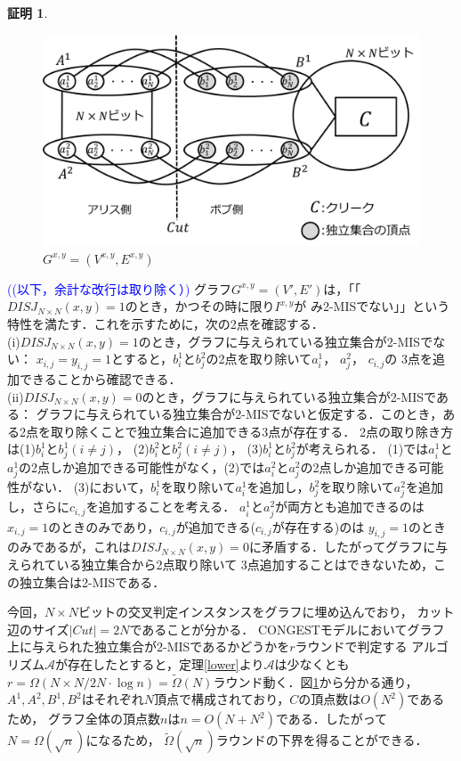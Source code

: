 \documentclass[12pt]{thesis}
\newcommand{\Izumi}[1]{\textcolor{blue}{(#1)}}
\newcommand{\CONGEST}{\textsf{CONGEST}}
\theoremstyle{definition}
\newtheorem*{prf*}{証明}
\begin{document}
\begin{prf*}
\begin{figure}[ht]
\begin{center}
\includegraphics[width=120mm]{2_Gxy.png}
\end{center}
\caption{$G^{x, y} = (V^{x,y}, E^{x,y})$}
\label{2_G(x,y)}
\end{figure}

\Izumi{(以下，余計な改行は取り除く）}
グラフ$G^{x, y} = (V', E')$は，「「$DISJ_{N \times N} (x, y) = 1$のとき，かつその時に限り$I^{x,y}$が
み2-MISでない」」という特性を満たす．これを示すために，次の2点を確認する． \\
(i)$DISJ_{N \times N} (x, y) = 1$のとき，グラフに与えられている独立集合が2-MISでない： 
$x_{i, j} = y_{i, j} =1$とすると，$b_{i}^{1}$と$b_{j}^{2}$の2点を取り除いて$a_{i}^{1}$， $a_{j}^{2}$， $c_{i, j}$の
3点を追加できることから確認できる． \\
(ii)$DISJ_{N \times N} (x, y) = 0$のとき，グラフに与えられている独立集合が2-MISである： 
グラフに与えられている独立集合が2-MISでないと仮定する．このとき，ある2点を取り除くことで独立集合に追加できる3点が存在する．
2点の取り除き方は(1)$b_{i}^{1}$と$b_{j}^{1}(i \neq j)$， (2)$b_{i}^{2}$と$b_{j}^{2}(i \neq j)$， (3)$b_{i}^{1}$と$b_{j}^{2}$が考えられる．
(1)では$a_{i}^{1}$と$a_{j}^{1}$の2点しか追加できる可能性がなく，(2)では$a_{i}^{2}$と$a_{j}^{2}$の2点しか追加できる可能性がない．
(3)において，$b_{i}^{1}$を取り除いて$a_{i}^{1}$を追加し，$b_{j}^{2}$を取り除いて$a_{j}^{2}$を追加し，さらに$c_{i, j}$を追加することを考える．
$a_{i}^{1}$と$a_{j}^{2}$が両方とも追加できるのは$x_{i, j} = 1$のときのみであり，$c_{i, j}$が追加できる($c_{i, j}$が存在する)のは
$y_{i, j} = 1$のときのみであるが，これは$DISJ_{N \times N} (x, y) = 0$に矛盾する．したがってグラフに与えられている独立集合から2点取り除いて
3点追加することはできないため，この独立集合は2-MISである．

今回，$N \times N$ビットの交叉判定インスタンスをグラフに埋め込んでおり，
カット辺のサイズ$|Cut| = 2N$であることが分かる．
{\CONGEST}モデルにおいてグラフ上に与えられた独立集合が2-MISであるかどうかを$r$ラウンドで判定する
アルゴリズム$\mathcal{A}$が存在したとすると，定理\ref{lower}より$\mathcal{A}$は少なくとも
$r = \Omega (N \times N/ 2N \cdot \log n) = \tilde{\Omega}(N)$ラウンド動く．図\ref{2_G(x,y)}から分かる通り，
$A^{1}, A^{2}, B^{1}, B^{2}$はそれぞれ$N$頂点で構成されており，$C$の頂点数は$O(N^{2})$であるため，
グラフ全体の頂点数$n$は$n = O(N + N^{2})$である．したがって$N = \Omega(\sqrt{n})$になるため，
$\tilde{\Omega}(\sqrt{n})$ラウンドの下界を得ることができる．
\end{prf*}
\newpage
\end{document}
